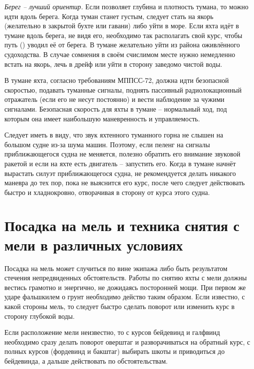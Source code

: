 \textit{Берег \--- лучший ориентир.} Если позволяет глубина и плотность тумана,
то можно идти вдоль берега. Когда туман станет густым, следует стать
на якорь (желательно в закрытой бухте или гавани) либо уйти в
море. Если яхта идёт в тумане вдоль берега, не видя его, необходимо
так располагать свой курс, чтобы путь (\PU) уводил её от берега. В
тумане желательно уйти из района оживлённого судоходства. В случае
сомнения в своём счислимом месте нужно немедленно встать на якорь,
лечь в дрейф или уйти в сторону заведомо чистой воды.

В тумане яхта, согласно требованиям МППСС-72, должна идти безопасной
скоростью, подавать туманные сигналы, поднять пассивный
радиолокационный отражатель (если его не несут постоянно) и вести
наблюдение за чужими сигналами. Безопасная скорость для яхты в тумане
\--- нормальный ход, под которым она имеет наибольшую маневренность и
управляемость.

Следует иметь в виду, что звук яхтенного туманного горна не слышен на
большом судне из-за шума машин. Поэтому, если пеленг на сигналы
приближающегося судна не меняется, полезно обратить его внимание
звуковой ракетой и если на яхте есть двигатель \--- запустить
его. Когда в тумане начнёт вырастать силуэт приближающегося судна, не
рекомендуется делать никакого маневра до тех пор, пока не выяснится
его курс, после чего следует действовать быстро и хладнокровно,
отворачивая в сторону от курса этого судна.

\section{Посадка на мель и техника снятия с мели в различных условиях}

Посадка на мель может случиться по вине экипажа либо быть результатом
стечения непредвиденных обстоятельств. Работы по снятию яхты с мели
должны вестись грамотно и энергично, не дожидаясь посторонней
мощи. При первом же ударе фальшкилем о грунт необходимо действо таким
образом. Если известно, с какой стороны мель, то следует быстро
сделать поворот или изменить курс в сторону глубокой воды.

Если расположение мели неизвестно, то с курсов бейдевинд и галфвинд
необходимо сразу делать поворот оверштаг и разворачиваться на обратный
курс, с полных курсов (фордевинд и бакштаг) выбирать шкоты и
приводиться до бейдевинда, а дальше действовать по обстоятельствам.

